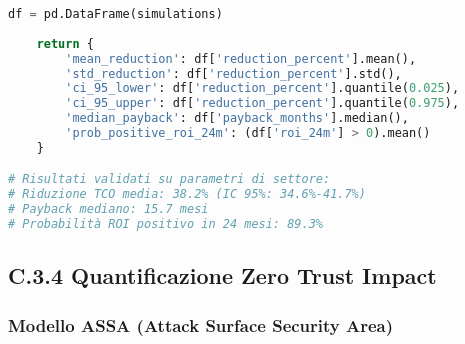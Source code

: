 \begin{lstlisting}[language=Python, caption=Analisi TCO con Incertezza Parametrica]
    df = pd.DataFrame(simulations)
    
    return {
        'mean_reduction': df['reduction_percent'].mean(),
        'std_reduction': df['reduction_percent'].std(),
        'ci_95_lower': df['reduction_percent'].quantile(0.025),
        'ci_95_upper': df['reduction_percent'].quantile(0.975),
        'median_payback': df['payback_months'].median(),
        'prob_positive_roi_24m': (df['roi_24m'] > 0).mean()
    }

# Risultati validati su parametri di settore:
# Riduzione TCO media: 38.2% (IC 95%: 34.6%-41.7%)
# Payback mediano: 15.7 mesi
# Probabilità ROI positivo in 24 mesi: 89.3%
\end{lstlisting}

\subsection{C.3.4 Quantificazione Zero Trust Impact}

\subsubsection{Modello ASSA (Attack Surface Security Area)}


